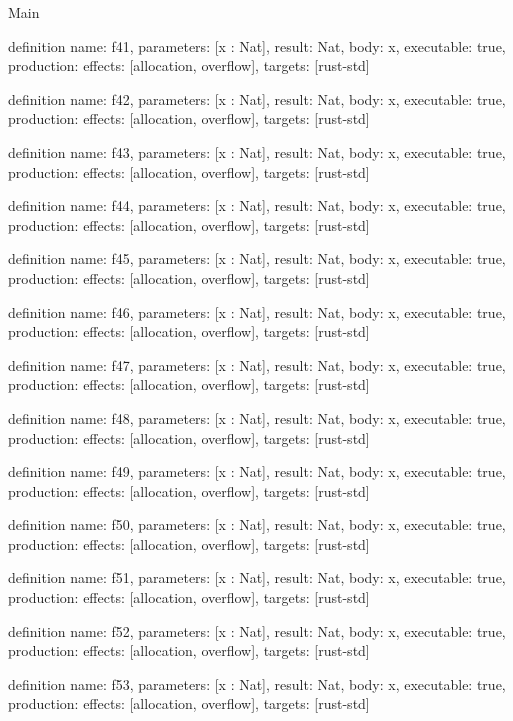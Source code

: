 \begin{lexlean}{Main}
\begin{semanticmodule}
definition{
  name: f41,
  parameters: [x : Nat],
  result: Nat,
  body: x,
  executable: true,
  production: {effects: [allocation, overflow], targets: [rust-std]}
}

definition{
  name: f42,
  parameters: [x : Nat],
  result: Nat,
  body: x,
  executable: true,
  production: {effects: [allocation, overflow], targets: [rust-std]}
}

definition{
  name: f43,
  parameters: [x : Nat],
  result: Nat,
  body: x,
  executable: true,
  production: {effects: [allocation, overflow], targets: [rust-std]}
}

definition{
  name: f44,
  parameters: [x : Nat],
  result: Nat,
  body: x,
  executable: true,
  production: {effects: [allocation, overflow], targets: [rust-std]}
}

definition{
  name: f45,
  parameters: [x : Nat],
  result: Nat,
  body: x,
  executable: true,
  production: {effects: [allocation, overflow], targets: [rust-std]}
}

definition{
  name: f46,
  parameters: [x : Nat],
  result: Nat,
  body: x,
  executable: true,
  production: {effects: [allocation, overflow], targets: [rust-std]}
}

definition{
  name: f47,
  parameters: [x : Nat],
  result: Nat,
  body: x,
  executable: true,
  production: {effects: [allocation, overflow], targets: [rust-std]}
}

definition{
  name: f48,
  parameters: [x : Nat],
  result: Nat,
  body: x,
  executable: true,
  production: {effects: [allocation, overflow], targets: [rust-std]}
}

definition{
  name: f49,
  parameters: [x : Nat],
  result: Nat,
  body: x,
  executable: true,
  production: {effects: [allocation, overflow], targets: [rust-std]}
}

definition{
  name: f50,
  parameters: [x : Nat],
  result: Nat,
  body: x,
  executable: true,
  production: {effects: [allocation, overflow], targets: [rust-std]}
}

definition{
  name: f51,
  parameters: [x : Nat],
  result: Nat,
  body: x,
  executable: true,
  production: {effects: [allocation, overflow], targets: [rust-std]}
}

definition{
  name: f52,
  parameters: [x : Nat],
  result: Nat,
  body: x,
  executable: true,
  production: {effects: [allocation, overflow], targets: [rust-std]}
}

definition{
  name: f53,
  parameters: [x : Nat],
  result: Nat,
  body: x,
  executable: true,
  production: {effects: [allocation, overflow], targets: [rust-std]}
}


\end{semanticmodule}
\end{lexlean}
